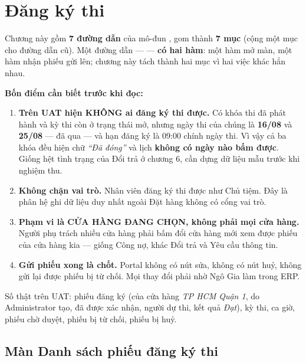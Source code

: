 \chapter{Đăng ký thi}

Chương này gồm \textbf{7 đường dẫn} của mô-đun , gom thành \textbf{7 mục}
(cộng một mục cho đường dẫn cũ). Một đường dẫn ---  --- \textbf{có hai
hàm}: một hàm mở màn, một hàm nhận phiếu gửi lên; chương này tách thành hai mục vì hai việc khác
hẳn nhau.

\textbf{Bốn điểm cần biết trước khi đọc:}

\begin{enumerate}[leftmargin=*]
  \item \textbf{Trên UAT hiện KHÔNG ai đăng ký thi được.} Có  khóa thi đã phát hành và
         kỳ thi còn ở trạng thái mở, nhưng ngày thi của chúng là \textbf{16/08} và
        \textbf{25/08} --- đã qua --- và hạn đăng ký là 09:00 chính ngày thi. Vì vậy cả ba khóa
        đều hiện chữ \emph{``Đã đóng''} và lịch \textbf{không có ngày nào bấm được}. Giống hệt
        tình trạng của Đổi trả ở chương 6, cần dựng dữ liệu mẫu trước khi nghiệm thu.
  \item \textbf{Không chặn vai trò.} Nhân viên đăng ký thi được như Chủ tiệm. Đây là phân hệ
        ghi dữ liệu duy nhất ngoài Đặt hàng không có cổng vai trò.
  \item \textbf{Phạm vi là CỬA HÀNG ĐANG CHỌN, không phải mọi cửa hàng.} Người phụ trách nhiều
        cửa hàng phải bấm đổi cửa hàng mới xem được phiếu của cửa hàng kia --- giống Công nợ,
        khác Đổi trả và Yêu cầu thông tin.
  \item \textbf{Gửi phiếu xong là chốt.} Portal không có nút sửa, không có nút huỷ, không gửi
        lại được phiếu bị từ chối. Mọi thay đổi phải nhờ Ngô Gia làm trong ERP.
\end{enumerate}

Số thật trên UAT:  phiếu đăng ký (của cửa hàng \emph{TP HCM Quận 1}, do Administrator
tạo, đã được xác nhận,  người dự thi, kết quả \emph{Đạt}),  kỳ thi,  ca giờ,
 phiếu chờ duyệt,  phiếu bị từ chối,  phiếu bị huỷ.

\section{Màn Danh sách phiếu đăng ký thi}
\medskip

